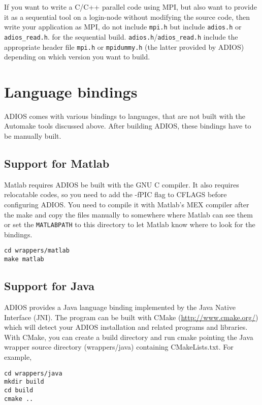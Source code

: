 If you want to write a C/C++ parallel code using MPI, but also want to provide it as a
sequential tool on a login-node without modifying the source code, then write your 
application as MPI, do not include \verb+mpi.h+ but include 
\verb+adios.h+ or \verb+adios_read.h+.
for the sequential build.
\verb+adios.h+/\verb+adios_read.h+ include the appropriate header file 
\verb+mpi.h+ or \verb+mpidummy.h+ 
(the latter provided by ADIOS) depending on which version you want to build. 


\section{Language bindings}

ADIOS comes with various bindings to languages, that are not built with the Automake tools discussed above. After building ADIOS, these bindings have to be manually built.

\subsection{Support for Matlab}
\label{section-install-matlab}

Matlab requires ADIOS be built with the GNU C compiler. It also requires relocatable 
codes, so you need to add the -fPIC flag to CFLAGS before configuring ADIOS. 
You need to compile it with Matlab's MEX compiler after the make and copy the files 
manually to somewhere where Matlab can see them or set the \verb+MATLABPATH+ to this 
directory to let Matlab know where to look for the bindings.

\begin{lstlisting}
cd wrappers/matlab
make matlab
\end{lstlisting}


\subsection{Support for Java}
\label{section-install-java}

ADIOS provides a Java language binding implemented by the Java Native Interface (JNI).
The program can be built with CMake (\url{http://www.cmake.org/}) which will detect your ADIOS installation and related programs and libraries. With CMake, you can create a build directory and run cmake pointing the Java wrapper source directory (wrappers/java) containing CMakeLists.txt. For example, 
\begin{lstlisting}
cd wrappers/java
mkdir build
cd build
cmake ..
\end{lstlisting}

